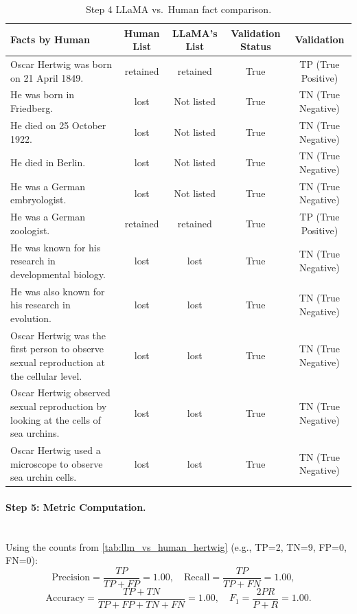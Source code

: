 \documentclass{DESSThesis}
\begin{document}
\begin{table}[H]
\centering
\caption{Step 4  LLaMA vs.\ Human fact comparison.}
\label{tab:llm_vs_human_hertwig}
\renewcommand{\arraystretch}{1.15}
\setlength{\tabcolsep}{6pt}
\begin{tabularx}{\textwidth}{X c c c c}
\toprule
\textbf{Facts by Human} & \textbf{Human List} & \textbf{LLaMA's List} & \textbf{Validation Status} & \textbf{Validation} \\
\midrule
Oscar Hertwig was born on 21 April 1849. & retained & retained & True & TP (True Positive) \\
He was born in Friedberg. & lost & Not listed & True & TN (True Negative) \\
He died on 25 October 1922. & lost & Not listed & True & TN (True Negative) \\
He died in Berlin. & lost & Not listed & True & TN (True Negative) \\
He was a German embryologist. & lost & Not listed & True & TN (True Negative) \\
He was a German zoologist. & retained & retained & True & TP (True Positive) \\
He was known for his research in developmental biology. & lost & lost & True & TN (True Negative) \\
He was also known for his research in evolution. & lost & lost & True & TN (True Negative) \\
Oscar Hertwig was the first person to observe sexual reproduction at the cellular level. & lost & lost & True & TN (True Negative) \\
Oscar Hertwig observed sexual reproduction by looking at the cells of sea urchins. & lost & lost & True & TN (True Negative) \\
Oscar Hertwig used a microscope to observe sea urchin cells. & lost & lost & True & TN (True Negative) \\
\bottomrule
\end{tabularx}
\end{table}

\paragraph{Step 5: Metric Computation.}\\

Using the counts from \autoref{tab:llm_vs_human_hertwig} (e.g., TP=2, TN=9, FP=0, FN=0):
\[
\text{Precision}=\frac{TP}{TP+FP}=1.00,\quad
\text{Recall}=\frac{TP}{TP+FN}=1.00,\quad\]
\[
\text{Accuracy}=\frac{TP+TN}{TP+FP+TN+FN}=1.00,\quad
F_1=\frac{2PR}{P+R}=1.00.
\]
\end{document}
